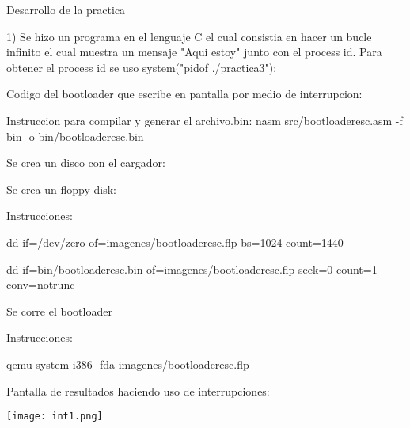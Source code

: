 \documentclass[12pt, a4paper]{report}
\begin{document}
\newpage

\begin{center}
Desarrollo de la practica
\end{center}

\bigskip
\bigskip



\begin{center}
1) Se hizo un programa en el lenguaje C el cual consistia en hacer un bucle infinito el cual muestra un mensaje "Aqui estoy" junto con el process id.
Para obtener el process id se uso system("pidof ./practica3");

\bigskip
\bigskip

\begin{flushleft}
Codigo del bootloader que escribe en pantalla por medio de interrupcion:

\bigskip
\bigskip


\end{flushleft}

\bigskip
\bigskip

\end{center}
\begin{center}

\bigskip
\bigskip

\newpage

Instruccion para compilar y generar el archivo.bin: nasm src/bootloaderesc.asm -f bin -o  bin/bootloaderesc.bin

\bigskip
\end{center}
\begin{center}
Se crea un disco con el cargador:

Se crea un floppy disk:

Instrucciones: 
\bigskip

dd if=/dev/zero of=imagenes/bootloaderesc.flp bs=1024 count=1440

\bigskip

dd if=bin/bootloaderesc.bin of=imagenes/bootloaderesc.flp seek=0 count=1 conv=notrunc

\bigskip

Se corre el bootloader

\bigskip

Instrucciones:

\bigskip

qemu-system-i386 -fda imagenes/bootloaderesc.flp

\bigskip

Pantalla de resultados haciendo uso de interrupciones:

\bigskip

\texttt{[image: int1.png]}

\bigskip

\end{center}
\end{document}
